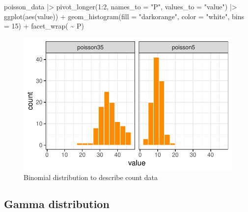 \documentclass[
  letterpaper,
  DIV=11,
  numbers=noendperiod]{scrreprt}
\newenvironment{Shaded}{\begin{snugshade}}{\end{snugshade}}
\newcommand{\AttributeTok}[1]{\textcolor[rgb]{0.40,0.45,0.13}{#1}}
\newcommand{\DecValTok}[1]{\textcolor[rgb]{0.68,0.00,0.00}{#1}}
\newcommand{\FunctionTok}[1]{\textcolor[rgb]{0.28,0.35,0.67}{#1}}
\newcommand{\NormalTok}[1]{\textcolor[rgb]{0.00,0.23,0.31}{#1}}
\newcommand{\SpecialCharTok}[1]{\textcolor[rgb]{0.37,0.37,0.37}{#1}}
\newcommand{\StringTok}[1]{\textcolor[rgb]{0.13,0.47,0.30}{#1}}
\begin{document}
\begin{Shaded}
\begin{Highlighting}[]
\NormalTok{poisson\_data }\SpecialCharTok{|\textgreater{}}
  \FunctionTok{pivot\_longer}\NormalTok{(}\DecValTok{1}\SpecialCharTok{:}\DecValTok{2}\NormalTok{, }\AttributeTok{names\_to =} \StringTok{"P"}\NormalTok{,}
               \AttributeTok{values\_to =} \StringTok{"value"}\NormalTok{) }\SpecialCharTok{|\textgreater{}}
  \FunctionTok{ggplot}\NormalTok{(}\FunctionTok{aes}\NormalTok{(value)) }\SpecialCharTok{+}
  \FunctionTok{geom\_histogram}\NormalTok{(}\AttributeTok{fill =} \StringTok{"darkorange"}\NormalTok{,}
                 \AttributeTok{color =} \StringTok{"white"}\NormalTok{,}
                 \AttributeTok{bins =} \DecValTok{15}\NormalTok{) }\SpecialCharTok{+}
  \FunctionTok{facet\_wrap}\NormalTok{( }\SpecialCharTok{\textasciitilde{}}\NormalTok{ P) }
\end{Highlighting}
\end{Shaded}

\begin{figure}[H]

{\centering \includegraphics{./data-type-distributions_files/figure-pdf/fig-poisson-1.pdf}

}

\caption{\label{fig-poisson}Binomial distribution to describe count
data}

\end{figure}

\hypertarget{gamma-distribution}{%
\subsection{Gamma distribution}\label{gamma-distribution}}
\end{document}
